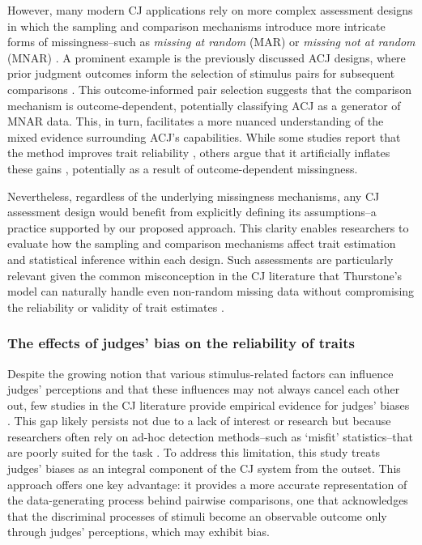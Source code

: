 \documentclass[
  authoryear,
  review,
  1p]{elsarticle}
\begin{document}
However, many modern CJ applications rely on more complex assessment
designs in which the sampling and comparison mechanisms introduce more
intricate forms of missingness--such as \emph{missing at random} (MAR)
or \emph{missing not at random} (MNAR) \citep{Little_et_al_2020}. A
prominent example is the previously discussed ACJ designs, where prior
judgment outcomes inform the selection of stimulus pairs for subsequent
comparisons \citep{Pollitt_2012a, Pollitt_2012b, Bramley_2015}. This
outcome-informed pair selection suggests that the comparison mechanism
is outcome-dependent, potentially classifying ACJ as a generator of MNAR
data. This, in turn, facilitates a more nuanced understanding of the
mixed evidence surrounding ACJ's capabilities. While some studies report
that the method improves trait reliability
\citep{Pollitt_et_al_2003, Pollitt_2012a, Pollitt_2012b}, others argue
that it artificially inflates these gains
\citep{Bramley_2015, Bramley_et_al_2019, Crompvoets_et_al_2020, Crompvoets_et_al_2022},
potentially as a result of outcome-dependent missingness.

Nevertheless, regardless of the underlying missingness mechanisms, any
CJ assessment design would benefit from explicitly defining its
assumptions--a practice supported by our proposed approach. This clarity
enables researchers to evaluate how the sampling and comparison
mechanisms affect trait estimation and statistical inference within each
design. Such assessments are particularly relevant given the common
misconception in the CJ literature that Thurstone's model can naturally
handle even non-random missing data without compromising the reliability
or validity of trait estimates \citep{Bramley_2008}.

\subsubsection{The effects of judges' bias on the reliability of
traits}\label{sec-discussion_RA2}

Despite the growing notion that various stimulus-related factors can
influence judges' perceptions
\citep{vanDaal_et_al_2016, Lesterhuis_et_al_2018, Chambers_et_al_2022}
and that these influences may not always cancel each other out, few
studies in the CJ literature provide empirical evidence for judges'
biases
\citep{Pollitt_et_al_2003, vanDaal_et_al_2016, Bartholomew_et_al_2020a}.
This gap likely persists not due to a lack of interest or research but
because researchers often rely on ad-hoc detection methods--such as
`misfit' statistics--that are poorly suited for the task
\citep{Kelly_et_al_2022}. To address this limitation, this study treats
judges' biases as an integral component of the CJ system from the
outset. This approach offers one key advantage: it provides a more
accurate representation of the data-generating process behind pairwise
comparisons, one that acknowledges that the discriminal processes of
stimuli become an observable outcome only through judges' perceptions,
which may exhibit bias.
\end{document}
